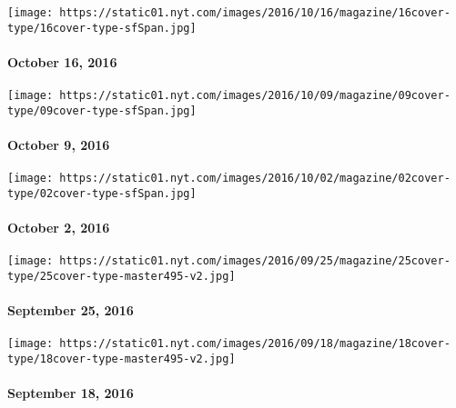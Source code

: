 \href{http://www.nytimes.com/indexes/2016/10/16/magazine/index.html}{}

\texttt{[image: https://static01.nyt.com/images/2016/10/16/magazine/16cover-type/16cover-type-sfSpan.jpg]}

\hypertarget{october-16-2016}{%
\paragraph{October 16, 2016}\label{october-16-2016}}

\href{http://www.nytimes.com/indexes/2016/10/09/magazine/index.html}{}

\texttt{[image: https://static01.nyt.com/images/2016/10/09/magazine/09cover-type/09cover-type-sfSpan.jpg]}

\hypertarget{october-9-2016}{%
\paragraph{October 9, 2016}\label{october-9-2016}}

\href{http://www.nytimes.com/indexes/2016/10/02/magazine/index.html}{}

\texttt{[image: https://static01.nyt.com/images/2016/10/02/magazine/02cover-type/02cover-type-sfSpan.jpg]}

\hypertarget{october-2-2016}{%
\paragraph{October 2, 2016}\label{october-2-2016}}

\href{http://www.nytimes.com/indexes/2016/09/25/magazine/index.html}{}

\texttt{[image: https://static01.nyt.com/images/2016/09/25/magazine/25cover-type/25cover-type-master495-v2.jpg]}

\hypertarget{september-25-2016}{%
\paragraph{September 25, 2016}\label{september-25-2016}}

\href{http://www.nytimes.com/indexes/2016/09/18/magazine/index.html}{}

\texttt{[image: https://static01.nyt.com/images/2016/09/18/magazine/18cover-type/18cover-type-master495-v2.jpg]}

\hypertarget{september-18-2016}{%
\paragraph{September 18, 2016}\label{september-18-2016}}

